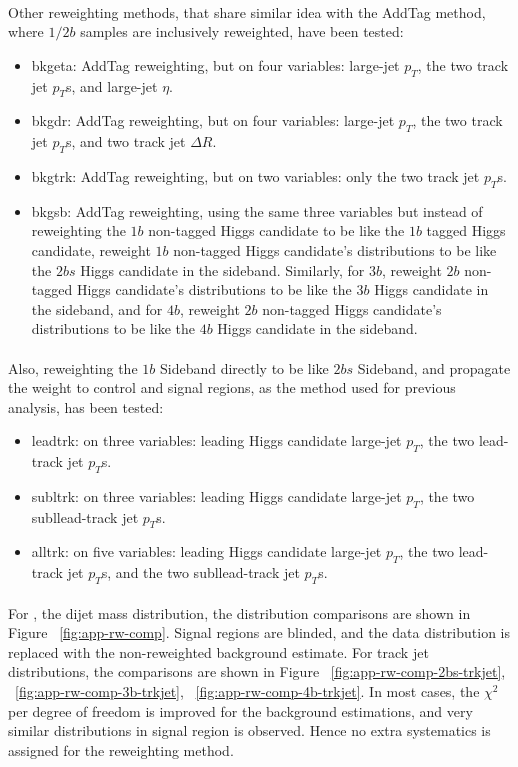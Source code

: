 \paragraph{}
Other reweighting methods, that share similar idea with the AddTag method, where $1/2b$ samples are inclusively reweighted, have been tested:
\begin{itemize}
	\item bkgeta: AddTag reweighting, but on four variables: large-\R jet $p_{T}$, the two track jet $p_{T}$s, and large-\R jet $\eta$.
	\item bkgdr: AddTag reweighting, but on four variables: large-\R jet $p_{T}$, the two track jet $p_{T}$s, and two track jet $\Delta R$.
	\item bkgtrk: AddTag reweighting, but on two variables: only the two track jet $p_{T}$s.
	\item bkgsb: AddTag reweighting, using the same three variables but instead of reweighting the $1b$ non-tagged Higgs candidate to be like the $1b$ tagged Higgs candidate, reweight $1b$ non-tagged Higgs candidate's distributions to be like the $2bs$ Higgs candidate in the sideband. Similarly, for $3b$, reweight $2b$ non-tagged Higgs candidate's distributions to be like the $3b$ Higgs candidate in the sideband, and for $4b$, reweight $2b$ non-tagged Higgs candidate's distributions to be like the $4b$ Higgs candidate in the sideband.
\end{itemize}

\paragraph{}
Also, reweighting the $1b$ Sideband directly to be like $2bs$ Sideband, and propagate the weight to control and signal regions, as the method used for previous analysis, has been tested:
\begin{itemize}
	\item leadtrk: on three variables: leading Higgs candidate large-\R jet $p_{T}$, the two lead-track jet $p_{T}$s.
	\item subltrk: on three variables: leading Higgs candidate large-\R jet $p_{T}$, the two subllead-track jet $p_{T}$s.
	\item alltrk: on five variables: leading Higgs candidate large-\R jet $p_{T}$, the two lead-track jet $p_{T}$s, and the two subllead-track jet $p_{T}$s.
\end{itemize}

\paragraph{}
For \mtwoJ, the dijet mass distribution, the distribution comparisons are shown in Figure ~\ref{fig:app-rw-comp}. Signal regions are blinded, and the data distribution is replaced with the non-reweighted background estimate. 
For track jet \pt distributions, the comparisons are shown in Figure ~\ref{fig:app-rw-comp-2bs-trkjet}, ~\ref{fig:app-rw-comp-3b-trkjet}, ~\ref{fig:app-rw-comp-4b-trkjet}. 
In most cases, the $\chi^2$ per degree of freedom is improved for the background estimations, and very similar distributions in signal region is observed. Hence no extra systematics is assigned for the reweighting method.

